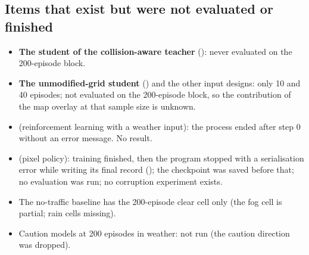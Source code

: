 \subsection{Items that exist but were not evaluated or finished}
\begin{itemize}
\item \textbf{The student of the collision-aware teacher} (): never evaluated on the 200-episode block.
\item \textbf{The unmodified-grid student} () and the other input designs: only 10 and 40 episodes; not evaluated on the 200-episode block, so the contribution of the map overlay at that sample size is unknown.
\item \textbf{} (reinforcement learning with a weather input): the process ended after step 0 without an error message. No result.
\item \textbf{} (pixel policy): training finished, then the program stopped with a serialisation error while writing its final record (); the checkpoint  was saved before that; no evaluation was run; no corruption experiment exists.
\item The no-traffic baseline has the 200-episode clear cell only (the fog cell is partial; rain cells missing).
\item Caution models at 200 episodes in weather: not run (the caution direction was dropped).
\end{itemize}

